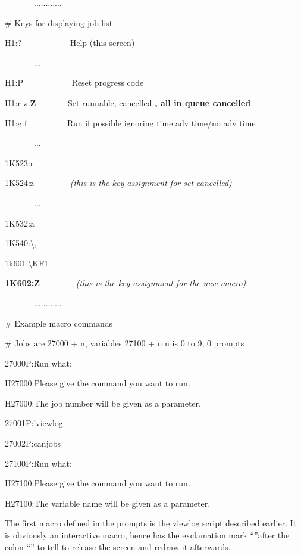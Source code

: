 \begin{exparasmall}

\ \ \ \ \ \ \ ............

\# Keys for displaying job list

\bigskip


H1:? \ \ \ \ \ \ \ \ \ \ \ Help (this screen)

\ \ \ \ \ \ \ ...

H1:P \ \ \ \ \ \ \ \ \ \ \ Reset progress code

H1:r z \textbf{Z} \ \ \ \ \ \ \ Set runnable, cancelled \textbf{, all in queue cancelled}

H1:g f \ \ \ \ \ \ \ \ \ Run if possible ignoring time adv time/no adv time

\ \ \ \ \ \ \ ...

1K523:r

1K524:z \ \ \ \ \ \ \ \ \textit{(this is the key assignment for set cancelled)}

\ \ \ \ \ \ \ ...

1K532:a

1K540:{\textbackslash},

\bigskip


1k601:{\textbackslash}KF1

\textbf{1K602:Z} \ \ \ \ \ \ \ \ \textit{(this is the key assignment for the new macro)}

\ \ \ \ \ \ \ ............

\bigskip


\# Example macro commands

\# Jobs are 27000 + n, variables 27100 + n n is 0 to 9, 0 prompts

\bigskip


27000P:Run what:

H27000:Please give the command you want to run.

H27000:The job number will be given as a parameter.

27001P:!viewlog

27002P:canjobs

27100P:Run what:

H27100:Please give the command you want to run.

H27100:The variable name will be given as a parameter.

\end{exparasmall}

The first macro defined in the prompts is the viewlog script described earlier. It is obviously an interactive macro, hence has the
exclamation mark ``\exampletext{!}''after the colon ``\exampletext{:}'' to tell \BtqName{} to release the screen and redraw it afterwards.

